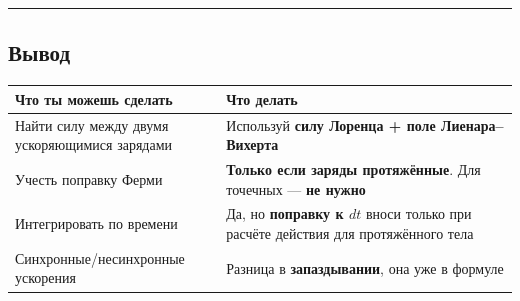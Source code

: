 \documentclass[11pt]{article}
\begin{document}
\begin{center}\rule{0.5\linewidth}{\linethickness}\end{center}

\subsection{Вывод}

\begin{longtable}[]{@{}ll@{}}
\toprule
\begin{minipage}[b]{0.31\columnwidth}\raggedright\strut
Что ты можешь сделать\strut
\end{minipage} & \begin{minipage}[b]{0.16\columnwidth}\raggedright\strut
Что делать\strut
\end{minipage}\tabularnewline
\midrule
\endhead
\begin{minipage}[t]{0.31\columnwidth}\raggedright\strut
Найти силу между двумя ускоряющимися зарядами\strut
\end{minipage} & \begin{minipage}[t]{0.16\columnwidth}\raggedright\strut
Используй \textbf{силу Лоренца + поле Лиенара--Вихерта}\strut
\end{minipage}\tabularnewline
\begin{minipage}[t]{0.31\columnwidth}\raggedright\strut
Учесть поправку Ферми\strut
\end{minipage} & \begin{minipage}[t]{0.16\columnwidth}\raggedright\strut
\textbf{Только если заряды протяжённые}. Для точечных --- \textbf{не
нужно}\strut
\end{minipage}\tabularnewline
\begin{minipage}[t]{0.31\columnwidth}\raggedright\strut
Интегрировать по времени\strut
\end{minipage} & \begin{minipage}[t]{0.16\columnwidth}\raggedright\strut
Да, но \textbf{поправку к \(dt\)} вноси только при расчёте действия для
протяжённого тела\strut
\end{minipage}\tabularnewline
\begin{minipage}[t]{0.31\columnwidth}\raggedright\strut
Синхронные/несинхронные ускорения\strut
\end{minipage} & \begin{minipage}[t]{0.16\columnwidth}\raggedright\strut
Разница в \textbf{запаздывании}, она уже в формуле\strut
\end{minipage}\tabularnewline
\bottomrule
\end{longtable}
\end{document}

